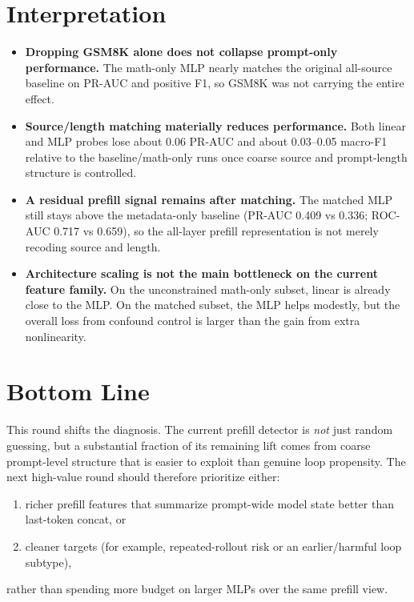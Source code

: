 \documentclass[11pt]{article}
\begin{document}
\section*{Interpretation}
\begin{itemize}
  \item \textbf{Dropping GSM8K alone does not collapse prompt-only performance.} The math-only MLP nearly matches the original all-source baseline on PR-AUC and positive F1, so GSM8K was not carrying the entire effect.
  \item \textbf{Source/length matching materially reduces performance.} Both linear and MLP probes lose about 0.06 PR-AUC and about 0.03--0.05 macro-F1 relative to the baseline/math-only runs once coarse source and prompt-length structure is controlled.
  \item \textbf{A residual prefill signal remains after matching.} The matched MLP still stays above the metadata-only baseline (PR-AUC 0.409 vs 0.336; ROC-AUC 0.717 vs 0.659), so the all-layer prefill representation is not merely recoding source and length.
  \item \textbf{Architecture scaling is not the main bottleneck on the current feature family.} On the unconstrained math-only subset, linear is already close to the MLP. On the matched subset, the MLP helps modestly, but the overall loss from confound control is larger than the gain from extra nonlinearity.
\end{itemize}

\section*{Bottom Line}
This round shifts the diagnosis. The current prefill detector is \emph{not} just random guessing, but a substantial fraction of its remaining lift comes from coarse prompt-level structure that is easier to exploit than genuine loop propensity. The next high-value round should therefore prioritize either:
\begin{enumerate}
  \item richer prefill features that summarize prompt-wide model state better than last-token concat, or
  \item cleaner targets (for example, repeated-rollout risk or an earlier/harmful loop subtype),
\end{enumerate}
rather than spending more budget on larger MLPs over the same prefill view.
\end{document}

